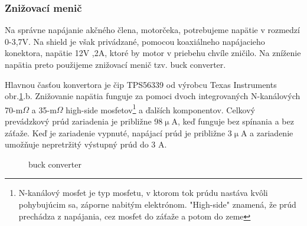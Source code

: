 \subsubsection{Znižovací menič}
\label{nap}

Na správne napájanie akčného člena, motorčeka, potrebujeme napätie v rozmedzí 0-3,7V. Na shield je však privádzané, pomocou koaxiálneho napájacieho konektora, napätie 12V ,2A, ktoré by motor v priebehu chvíle zničilo. Na zníženie napätia preto použijeme znižovací menič tzv. buck converter. 

Hlavnou časťou konvertora je čip TPS56339 od výrobcu Texas Instruments obr.\ref{OBRAZOK 2.1}.b. Znižovanie napätia funguje za pomoci dvoch integrovaných N-kanálových 70-m$\Omega$ a 35-m$\Omega$ high-side mosfetov\footnote[4]{N-kanálový mosfet je typ mosfetu, v ktorom tok prúdu nastáva kvôli pohybujúcim sa, záporne nabitým elektrónom. "High-side" znamená, že prúd prechádza z napájania, cez mosfet do záťaže a potom do zeme} a ďalších komponentov. Celkový prevádzkový prúd zariadenia je približne 98$\upmu$A, keď funguje bez spínania a bez záťaže. Keď je zariadenie vypnuté, napájací prúd je približne 3$\upmu$A a zariadenie umožňuje nepretržitý výstupný prúd do 3 A\cite{buckobr}.

\begin{figure}[!tbh]
	\hfill
	\hfill
	\hfill
	\caption{buck converter}\label{OBRAZOK 2.1}
\end{figure}


